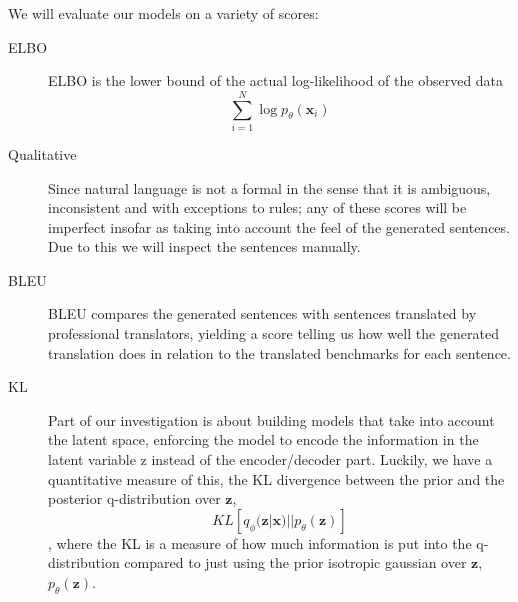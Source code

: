 We will evaluate our models on a variety of scores:

\begin{description}
\item[ELBO] ELBO is the lower bound of the actual log-likelihood of the observed
  data
  \begin{equation*}
    \sum_{i=1}^{N} \log p_{\theta}(\bm{x}_i)
  \end{equation*}
\item[Qualitative] Since natural language is not a formal in the sense that it
  is ambiguous, inconsistent and with exceptions to rules; any of these scores
  will be imperfect insofar as taking into account the feel of the generated
  sentences. Due to this we will inspect the sentences manually.
\item[BLEU] BLEU compares the generated sentences with sentences translated by
  professional translators, yielding a score telling us how well the generated
  translation does in relation to the translated benchmarks for each sentence.
\item[KL] Part of our investigation is about building models that take into
  account the latent space, enforcing the model to encode the information in the
  latent variable z instead of the encoder/decoder part. Luckily, we have a
  quantitative measure of this, the KL divergence between the prior and the
  posterior q-distribution over $\bm{z}$,
  \begin{equation*}
    KL[q_{\phi}(\bm{z} | \bm{x}) || p_{\theta}(\bm{z})]
  \end{equation*}
  , where the KL is a measure of how much information is put into the
  q-distribution compared to just using the prior isotropic gaussian over
  $\bm{z}$, $p_{\theta}(\bm{z})$.
\end{description}
